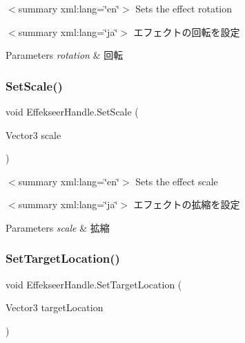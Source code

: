 $<$summary xml\+:lang=\char`\"{}en\char`\"{}$>$ Sets the effect rotation 

$<$summary xml\+:lang=\char`\"{}ja\char`\"{}$>$ エフェクトの回転を設定 


\begin{DoxyParams}{Parameters}
{\em rotation} & 回転\\
\hline
\end{DoxyParams}
\mbox{\label{struct_effekseer_handle_a858d40ff7676ec5c2ae062596f52795b}} 
\subsubsection{\texorpdfstring{Set\+Scale()}{SetScale()}}
{\footnotesize\ttfamily void Effekseer\+Handle.\+Set\+Scale (\begin{DoxyParamCaption}\item[{Vector3}]{scale }\end{DoxyParamCaption})\hspace{0.3cm}{\ttfamily [inline]}}

$<$summary xml\+:lang=\char`\"{}en\char`\"{}$>$ Sets the effect scale 

$<$summary xml\+:lang=\char`\"{}ja\char`\"{}$>$ エフェクトの拡縮を設定 


\begin{DoxyParams}{Parameters}
{\em scale} & 拡縮\\
\hline
\end{DoxyParams}
\mbox{\label{struct_effekseer_handle_aa13ed72d63bdcf16ab9683261b92c855}} 
\subsubsection{\texorpdfstring{Set\+Target\+Location()}{SetTargetLocation()}}
{\footnotesize\ttfamily void Effekseer\+Handle.\+Set\+Target\+Location (\begin{DoxyParamCaption}\item[{Vector3}]{target\+Location }\end{DoxyParamCaption})\hspace{0.3cm}{\ttfamily [inline]}}

